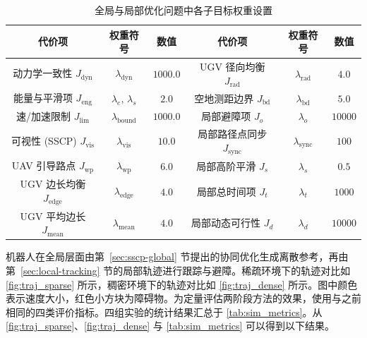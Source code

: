 \begin{table}[htb]
    \centering
    \caption{全局与局部优化问题中各子目标权重设置}
    \label{tab:global_weights}
    \label{tab:local_weights}
    \small
    \setlength{\tabcolsep}{4pt} %
    \begin{tabular}{ccc|ccc}
        \toprule
        代价项 & 权重符号 & 数值 & 代价项 & 权重符号 & 数值 \\
        \midrule
        动力学一致性 $J_{\mathrm{dyn}}$ & $\lambda_{\mathrm{dyn}}$ & $1000.0$ & UGV 径向均衡 $J_{\mathrm{rad}}$ & $\lambda_{\mathrm{rad}}$ & $4.0$ \\
        能量与平滑项 $J_{\mathrm{eng}}$ & $\lambda_{e},\,\lambda_{s}$ & $2.0$ & 空地测距边界 $J_{\mathrm{bd}}$ & $\lambda_{\mathrm{bd}}$ & $5.0$ \\
        速/加速限制 $J_{\mathrm{lim}}$ & $\lambda_{\mathrm{bound}}$ & $1000.0$ & 局部避障项 $J_{o}$ & $\lambda_{o}$ & $10000$ \\
        可视性 (SSCP) $J_{\mathrm{vis}}$ & $\lambda_{\mathrm{vis}}$ & $10.0$ & 局部路径点同步 $J_{\mathrm{sync}}$ & $\lambda_{\mathrm{sync}}$ & $100$ \\
        UAV 引导路点 $J_{\mathrm{wp}}$ & $\lambda_{\mathrm{wp}}$ & $6.0$ & 局部高阶平滑 $J_{s}$ & $\lambda_{s}$ & $0.5$ \\
        UGV 边长均衡 $J_{\mathrm{edge}}$ & $\lambda_{\mathrm{edge}}$ & $4.0$ & 局部总时间项 $J_{t}$ & $\lambda_{t}$ & $1000$ \\
        UGV 平均边长 $J_{\mathrm{mean}}$ & $\lambda_{\mathrm{mean}}$ & $4.0$ & 局部动态可行性 $J_{d}$ & $\lambda_{d}$ & $10000$ \\
        \bottomrule
    \end{tabular}
\end{table}

机器人在全局层面由第~\ref{sec:sscp-global} 节提出的协同优化生成离散参考，再由第~\ref{sec:local-tracking} 节的局部轨迹进行跟踪与避障。稀疏环境下的轨迹对比如 \autoref{fig:traj_sparse} 所示，稠密环境下的轨迹对比如 \autoref{fig:traj_dense} 所示。图中颜色表示速度大小，红色小方块为障碍物。为定量评估两阶段方法的效果，使用与之前相同的四类评价指标。四组实验的统计结果汇总于 \autoref{tab:sim_metrics}。从 \autoref{fig:traj_sparse}、\autoref{fig:traj_dense} 与 \autoref{tab:sim_metrics} 可以得到以下结果。

